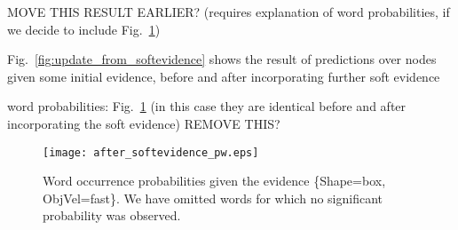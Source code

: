 MOVE THIS RESULT EARLIER? (requires explanation of word probabilities, if we decide to include Fig.~\ref{fig:after_softevidence:pw})


Fig.~\ref{fig:update_from_softevidence} shows the result of predictions over nodes given some initial evidence, before and after incorporating further soft evidence

\begin{figure*}
    \centering
     \quad
    \caption{Predictions about the action and hand velocity on a box object, before and after incorporating Action soft evidence from Gesture \acp{HMM}.}
    \label{fig:update_from_softevidence}
\end{figure*}

word probabilities: Fig.~\ref{fig:after_softevidence:pw} (in this case they are identical before and after incorporating the soft evidence) REMOVE THIS?

\begin{figure}
\centering
\texttt{[image: after\_softevidence\_pw.eps]}
\caption{Word occurrence probabilities given the evidence \{Shape=box, ObjVel=fast\}. We have omitted words for which no significant probability was observed.}
\label{fig:after_softevidence:pw}
\end{figure}
